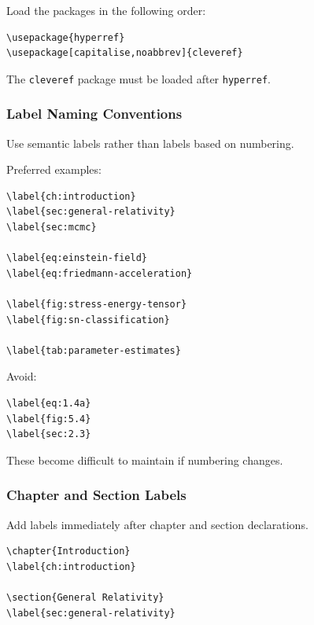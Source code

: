 \documentclass{article}
\begin{document}
Load the packages in the following order:

\begin{verbatim}
\usepackage{hyperref}
\usepackage[capitalise,noabbrev]{cleveref}
\end{verbatim}

The \texttt{cleveref} package must be loaded after \texttt{hyperref}.


\subsubsection*{Label Naming Conventions}

Use semantic labels rather than labels based on numbering.

Preferred examples:

\begin{verbatim}
\label{ch:introduction}
\label{sec:general-relativity}
\label{sec:mcmc}

\label{eq:einstein-field}
\label{eq:friedmann-acceleration}

\label{fig:stress-energy-tensor}
\label{fig:sn-classification}

\label{tab:parameter-estimates}
\end{verbatim}

Avoid:

\begin{verbatim}
\label{eq:1.4a}
\label{fig:5.4}
\label{sec:2.3}
\end{verbatim}

These become difficult to maintain if numbering changes.

\subsubsection*{Chapter and Section Labels}

Add labels immediately after chapter and section declarations.

\begin{verbatim}
\chapter{Introduction}
\label{ch:introduction}

\section{General Relativity}
\label{sec:general-relativity}
\end{verbatim}
\end{document}
